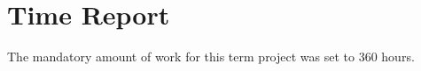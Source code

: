 
\chapter{Time Report}

\label{AppendixB}

The mandatory amount of work for this term project was set to 360 hours.

